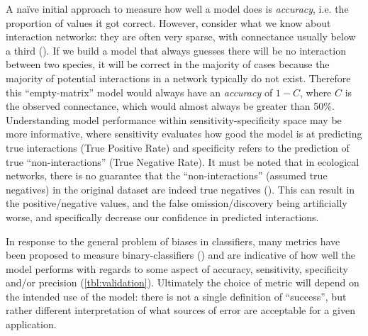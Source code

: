 \begin{refsection}
A naïve initial approach to measure how well a model does is
\emph{accuracy}, i.e. the proportion of values it got correct. However,
consider what we know about interaction networks: they are often very
sparse, with connectance usually below a third (\cite{Cohen1990ComFoo}).
If we build a model that always guesses there will be no interaction
between two species, it will be correct in the majority of cases because
the majority of potential interactions in a network typically do not
exist. Therefore this ``empty-matrix'' model would always have an
\emph{accuracy} of \(1-C\), where \(C\) is the observed connectance,
which would almost always be greater than 50\%. Understanding model
performance within sensitivity-specificity space may be more
informative, where sensitivity evaluates how good the model is at
predicting true interactions (True Positive Rate) and specificity refers
to the prediction of true ``non-interactions'' (True Negative Rate). It
must be noted that in ecological networks, there is no guarantee that
the ``non-interactions'' (assumed true negatives) in the original
dataset are indeed true negatives (\cite{Jordano2016ChaEco,
Jordano2016SamNet}). This can result in the positive/negative values,
and the false omission/discovery being artificially worse, and
specifically decrease our confidence in predicted interactions.

In response to the general problem of biases in classifiers, many
metrics have been proposed to measure binary-classifiers
(\cite{Gu2009EvaMea, Drummond2006CosCur}) and are indicative of how well
the model performs with regards to some aspect of accuracy, sensitivity,
specificity and/or precision (\autoref{tbl:validation}). Ultimately the choice of
metric will depend on the intended use of the model: there is not a
single definition of ``success'', but rather different interpretation of
what sources of error are acceptable for a given application.


\end{refsection}
